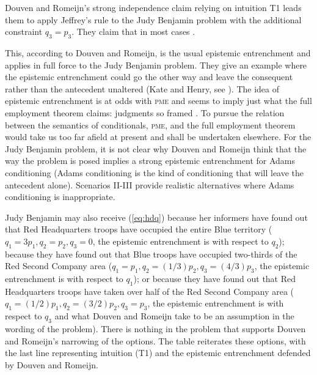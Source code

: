 \documentclass[phd,12pt,oneside]{ubcthesis}
\begin{document}
Douven and Romeijn's strong independence claim relying on intuition T1
leads them to apply Jeffrey's rule to the Judy Benjamin problem with
the additional constraint $q_{3}=p_{3}$. They claim that in most cases
.

This, according to Douven and Romeijn, is the usual epistemic
entrenchment and applies in full force to the Judy Benjamin problem.
They give an example where the epistemic entrenchment could go the
other way and leave the consequent rather than the antecedent
unaltered (Kate and Henry, see ). The
idea of epistemic entrenchment is at odds with \textsc{pme} and
seems to imply just what the full employment theorem claims: judgments
so framed  . To pursue the
relation between the semantics of conditionals, \textsc{pme}, and
the full employment theorem would take us too far afield at present
and shall be undertaken elsewhere. For the Judy Benjamin problem, it
is not clear why Douven and Romeijn think that the way the problem is
posed implies a strong epistemic entrenchment for Adams conditioning
(Adams conditioning is the kind of conditioning that will leave the
antecedent alone). Scenarios II-III provide realistic alternatives
where Adams conditioning is inappropriate.

Judy Benjamin may also receive ({\ref{eq:hdq}}) because her informers
have found out that Red Headquarters troops have occupied the entire
Blue territory ($q_{1}=3p_{1},q_{2}=p_{2},q_{3}=0$, the epistemic
entrenchment is with respect to $q_{2}$); because they have found out
that Blue troops have occupied two-thirds of the Red Second Company
area ($q_{1}=p_{1},q_{2}=(1/3)p_{2},q_{3}=(4/3)p_{3}$, the epistemic
entrenchment is with respect to $q_{1}$); or because they have found
out that Red Headquarters troops have taken over half of the Red
Second Company area ($q_{1}=(1/2)p_{1},q_{2}=(3/2)p_{2},q_{3}=p_{3}$,
the epistemic entrenchment is with respect to $q_{3}$ and what Douven
and Romeijn take to be an assumption in the wording of the problem).
There is nothing in the problem that supports Douven and Romeijn's
narrowing of the options. The table reiterates these options, with the
last line representing intuition (T1) and the epistemic entrenchment
defended by Douven and Romeijn.
\end{document}
